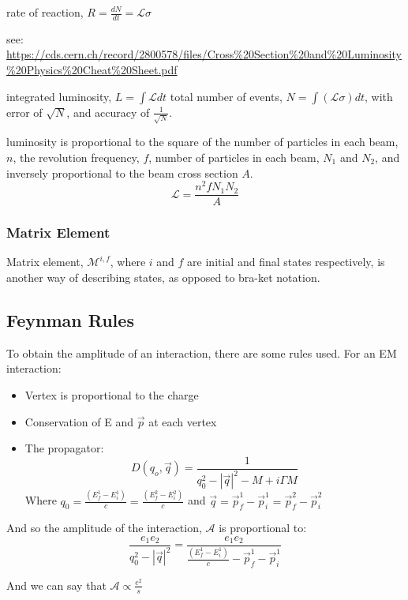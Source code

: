 \documentclass[11pt,a4paper]{article}
\begin{document}
rate of reaction, $R = \frac{dN}{dt} = \mathscr{L}\sigma$

see: \url{https://cds.cern.ch/record/2800578/files/Cross%20Section%20and%20Luminosity%20Physics%20Cheat%20Sheet.pdf}

integrated luminosity, $L = \int \mathscr{L} dt$
total number of events, $N = \int (\mathscr{L}\sigma) dt$, with error of $\sqrt{N}$, and accuracy of $\frac{1}{\sqrt{N}}$.

luminosity is proportional to the square of the number of particles in each beam, $n$, the revolution frequency, $f$, number of particles in each beam, $N_1$ and $N_2$, and inversely proportional to the beam cross section $A$.
\begin{equation}
    \mathscr{L} = \frac{n^2 f N_1 N_2}{A}
\end{equation}

\subsubsection{Matrix Element}
Matrix element, $\mathscr{M}^{i, f}$, where $i$ and $f$ are initial and final states respectively, is another way of describing states, as opposed to bra-ket notation. 
\subsection{Feynman Rules}
To obtain the amplitude of an interaction, there are some rules used. For an EM interaction:
\begin{itemize}
    \item Vertex is proportional to the charge
    \item Conservation of E and $\vec{p}$ at each vertex
    \item The propagator: 
        \begin{equation}
            D(q_o, \vec{q}) = \frac{1}{q_0^2 - |\vec{q}|^2 - M + i\Gamma M}
        \end{equation}
        Where $q_0 = \frac{(E^1 _f - E^1 _i)}{c} = \frac{(E^2 _f - E^2 _i)}{c}$
        and $\vec{q} = \vec{p}^1_f - \vec{p}^1_i = \vec{p}^2_f - \vec{p}^2_i$
\end{itemize}
And so the amplitude of the interaction, $\mathscr{A}$ is proportional to:
\begin{equation}
    \frac{e_1 e_2}{q_0^2 - |\vec{q}|^2} = \frac{e_1 e_2}{\frac{(E^1 _f - E^1 _i)}{c} - \vec{p}^1_f - \vec{p}^1_i}
\end{equation}

And we can say that $\mathscr{A} \propto \frac{e^2}{s}$
\end{document}
